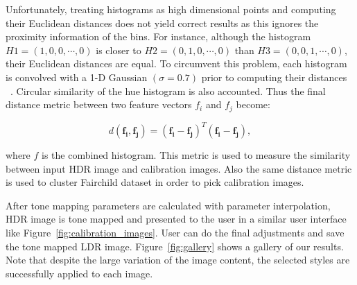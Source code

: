 Unfortunately, treating histograms as high dimensional points and computing their Euclidean distances does not yield correct results as this ignores the proximity information of the bins. For instance, although the histogram $H1 = (1, 0, 0, \cdots, 0)$ is closer to
$H2 = (0, 1, 0, \cdots, 0)$ than $H3 = (0, 0, 1, \cdots, 0)$, their Euclidean distances are equal. To circumvent this problem, each histogram is convolved with a 1-D Gaussian $(\sigma = 0.7)$ prior to computing their distances ~\cite{Ben2006}. Circular similarity of the hue histogram is also accounted. Thus the final distance metric between two feature vectors \textbf{$f_i$} and \textbf{$f_j$} become:

\begin{equation}
    d(\mathbf{f_i, f_j}) = \mathbf{(f_i - f_j)}^T\mathbf{(f_i-f_j)},
\end{equation}

where \textbf{$f$} is the combined histogram. This metric is used to measure the similarity between input HDR image and calibration images. Also the same distance metric is used to cluster Fairchild dataset in order to pick calibration images.

After tone mapping parameters are calculated with parameter interpolation, HDR image is tone mapped and presented to the user in a similar user interface like Figure~\ref{fig:calibration_images}. User can do the final adjustments and save the tone mapped LDR image. Figure~\ref{fig:gallery} shows a gallery of our results. Note that despite the large variation of the image content, the selected styles are successfully applied to each image.

